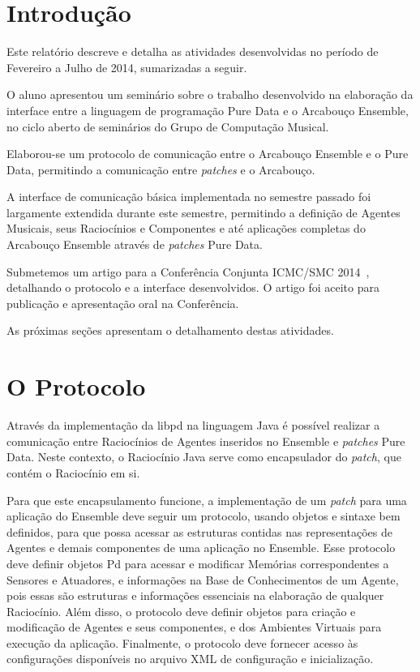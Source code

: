 \documentclass[a4paper, 11pt, twoside]{article}
\begin{document}
\begin{multicols}{2}

\section{Introdução}

Este relatório descreve e detalha as atividades desenvolvidas no período de 
Fevereiro a Julho de 2014, sumarizadas a seguir.

O aluno apresentou um seminário sobre o trabalho desenvolvido na elaboração da 
interface entre a linguagem de programação Pure Data e o Arcabouço Ensemble, 
no ciclo aberto de seminários do Grupo de Computação Musical.

Elaborou-se um protocolo de comunicação entre o Arcabouço Ensemble e o
Pure Data, permitindo a comunicação entre \textit{patches} e o Arcabouço.

A interface de comunicação básica implementada no semestre passado foi
largamente extendida durante este semestre, permitindo a definição de
Agentes Musicais, seus Raciocínios e Componentes e até aplicações
completas do Arcabouço Ensemble através de \textit{patches} Pure Data.

Submetemos um artigo para a Conferência Conjunta ICMC/SMC 2014~\cite{},
detalhando o protocolo e a interface desenvolvidos. O artigo foi aceito
para publicação e apresentação oral na Conferência.

As próximas seções apresentam o detalhamento destas atividades.

\section{O Protocolo}

Através da implementação da libpd na linguagem Java é possível
realizar a comunicação entre Raciocínios de Agentes inseridos no
Ensemble e \textit{patches} Pure Data. Neste contexto, o Raciocínio
Java serve como encapsulador do \textit{patch}, que contém o Raciocínio em si.

Para que este encapsulamento funcione, a implementação de um \textit{patch} 
para uma aplicação do Ensemble deve seguir um protocolo, usando objetos e
sintaxe bem definidos, para que possa acessar as estruturas contidas nas
representações de Agentes e demais componentes de uma aplicação no Ensemble.
Esse protocolo deve definir objetos Pd para acessar e modificar Memórias
correspondentes a Sensores e Atuadores, e informações na Base de Conhecimentos
de um Agente, pois essas são estruturas e informações essenciais na elaboração
de qualquer Raciocínio. Além disso, o protocolo deve definir objetos para
criação e modificação de Agentes e seus componentes, e dos Ambientes Virtuais
para execução da aplicação. Finalmente, o protocolo deve fornecer acesso às 
configurações disponíveis no arquivo XML de configuração e inicialização.


\end{multicols}
\end{document}
